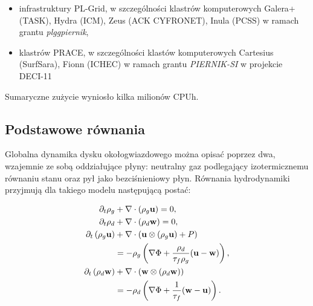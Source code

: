 \begin{itemize}
   \item infrastruktury PL-Grid, w szczególności klastrów
      komputerowych Galera+ (TASK), Hydra (ICM), Zeus (ACK CYFRONET), Inula
      (PCSS) w ramach grantu \emph{plggpiernik},
   \item klastrów PRACE, w szczególności klastów komputerowych
      Cartesius (SurfSara), Fionn (ICHEC) w ramach grantu \emph{PIERNIK-SI} w
      projekcie DECI-11
\end{itemize}
Sumaryczne zużycie wyniosło kilka milionów CPUh.




\subsection{Podstawowe równania}
Globalna dynamika dysku okołogwiazdowego można opisać poprzez dwa, wzajemnie ze
sobą oddziałujące płyny: neutralny gaz podlegający izotermicznemu równaniu
stanu oraz pył jako bezciśnieniowy płyn. Równania hydrodynamiki przyjmują dla
takiego modelu następującą postać:

\begin{align}
\partial_t \rho_g &+ \nabla\cdot\left(\rho_g\mathbf{u}\right) = 0,\\
\partial_t \rho_d &+ \nabla\cdot\left(\rho_d\mathbf{w}\right) = 0,\\
\partial_t \left(\rho_g\mathbf{u}\right) &+
   \nabla\cdot(\mathbf{u}\otimes(\rho_g\mathbf{u})+P) \notag\\
 &= -\rho_g\left(\nabla\Phi +
\frac{\rho_d}{\tau_f\rho_g}(\mathbf{u}-\mathbf{w})\right),\label{eq3}\\
\partial_t \left(\rho_d\mathbf{w}\right) &+
\nabla\cdot(\mathbf{w}\otimes(\rho_d\mathbf{w})) \notag\\
 &= -\rho_d\left(\nabla\Phi + \frac{1}{\tau_f}(\mathbf{w}-\mathbf{u})\right)
\label{eq4}.
\end{align}

